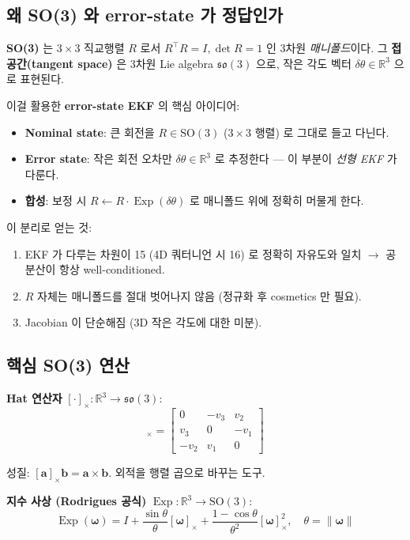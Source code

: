 \documentclass[11pt,a4paper,oneside]{report}
\newcommand{\R}{\mathbb{R}}
\newcommand{\so}{\mathfrak{so}}
\newcommand{\SO}{\mathrm{SO}}
\newcommand{\T}{^{\!\top}}
\newcommand{\skewop}[1]{[#1]_{\!\times}}
\DeclareMathOperator{\Exp}{Exp}
\begin{document}
\subsection{왜 SO(3) 와 error-state 가 정답인가}

\textbf{SO(3)} 는 \(3 \times 3\) 직교행렬 \(R\) 로서 \(R\T R = I, \det R = 1\) 인 3차원 \emph{매니폴드}이다. 그 \textbf{접공간(tangent space)} 은 3차원 Lie algebra \(\so(3)\) 으로, 작은 각도 벡터 \(\delta\theta \in \R^3\) 으로 표현된다.

이걸 활용한 \textbf{error-state EKF} 의 핵심 아이디어:
\begin{itemize}
\item \textbf{Nominal state}: 큰 회전을 \(R \in \SO(3)\) (\(3\times 3\) 행렬) 로 그대로 들고 다닌다.
\item \textbf{Error state}: 작은 회전 오차만 \(\delta\theta \in \R^3\) 로 추정한다 — 이 부분이 \emph{선형 EKF} 가 다룬다.
\item \textbf{합성}: 보정 시 \(R \leftarrow R \cdot \Exp(\delta\theta)\) 로 매니폴드 위에 정확히 머물게 한다.
\end{itemize}

이 분리로 얻는 것:
\begin{enumerate}
\item EKF 가 다루는 차원이 15 (4D 쿼터니언 시 16) 로 정확히 자유도와 일치 \(\to\) 공분산이 항상 well-conditioned.
\item \(R\) 자체는 매니폴드를 절대 벗어나지 않음 (정규화 후 cosmetics 만 필요).
\item Jacobian 이 단순해짐 (3D 작은 각도에 대한 미분).
\end{enumerate}

\subsection{핵심 SO(3) 연산}

\textbf{Hat 연산자} \([\cdot]_\times : \R^3 \to \so(3)\):
\begin{equation}
\skewop{\bm{v}} =
\begin{bmatrix}
0 & -v_3 & v_2 \\
v_3 & 0 & -v_1 \\
-v_2 & v_1 & 0
\end{bmatrix}
\end{equation}

성질: \(\skewop{\bm{a}} \bm{b} = \bm{a} \times \bm{b}\). 외적을 행렬 곱으로 바꾸는 도구.

\textbf{지수 사상 (Rodrigues 공식)} \(\Exp : \R^3 \to \SO(3)\):
\begin{equation}
\Exp(\bm{\omega}) = I + \frac{\sin \theta}{\theta} \skewop{\bm{\omega}} + \frac{1 - \cos \theta}{\theta^2} \skewop{\bm{\omega}}^2, \quad \theta = \|\bm{\omega}\|
\end{equation}
\end{document}
